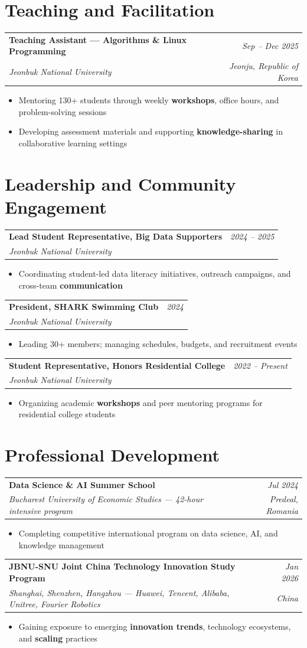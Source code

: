 \documentclass[a4paper,11pt]{article}
\makeatletter
\newcommand{\entryhead}[4]{%
  \vspace{6pt}%
  \begin{tabular*}{\textwidth}{@{}l@{\extracolsep{\fill}}r@{}}
    \textbf{#1} & {\small\textit{#2}}\\
    {\small\textit{#3}} & {\small\textit{#4}}\\
  \end{tabular*}\vspace{2pt}%
}
\newcommand{\bulletstart}{\begin{itemize}[leftmargin=0.20in, topsep=2pt, itemsep=2.5pt, parsep=0pt]}
\newcommand{\bulletend}{\end{itemize}}
\newcommand{\bitem}[1]{\item\small{#1}}
\makeatother
\begin{document}
\section{Teaching and Facilitation}

\entryhead
  {Teaching Assistant --- Algorithms \& Linux Programming}{Sep -- Dec 2025}
  {Jeonbuk National University}{Jeonju, Republic of Korea}
\bulletstart
  \bitem{Mentoring 130+ students through weekly \textbf{workshops}, office hours, and problem-solving sessions}
  \bitem{Developing assessment materials and supporting \textbf{knowledge-sharing} in collaborative learning settings}
\bulletend


\section{Leadership and Community Engagement}

\entryhead
  {Lead Student Representative, Big Data Supporters}{2024 -- 2025}
  {Jeonbuk National University}{}
\bulletstart
  \bitem{Coordinating student-led data literacy initiatives, outreach campaigns, and cross-team \textbf{communication}}
\bulletend

\entryhead
  {President, SHARK Swimming Club}{2024}
  {Jeonbuk National University}{}
\bulletstart
  \bitem{Leading 30+ members; managing schedules, budgets, and recruitment events}
\bulletend

\entryhead
  {Student Representative, Honors Residential College}{2022 -- Present}
  {Jeonbuk National University}{}
\bulletstart
  \bitem{Organizing academic \textbf{workshops} and peer mentoring programs for residential college students}
\bulletend


\section{Professional Development}

\entryhead
  {Data Science \& AI Summer School}{Jul 2024}
  {Bucharest University of Economic Studies --- 42-hour intensive program}{Predeal, Romania}
\bulletstart
  \bitem{Completing competitive international program on data science, AI, and knowledge management}
\bulletend

\entryhead
  {JBNU-SNU Joint China Technology Innovation Study Program}{Jan 2026}
  {Shanghai, Shenzhen, Hangzhou --- Huawei, Tencent, Alibaba, Unitree, Fourier Robotics}{China}
\bulletstart
  \bitem{Gaining exposure to emerging \textbf{innovation trends}, technology ecosystems, and \textbf{scaling} practices}
\bulletend
\end{document}
